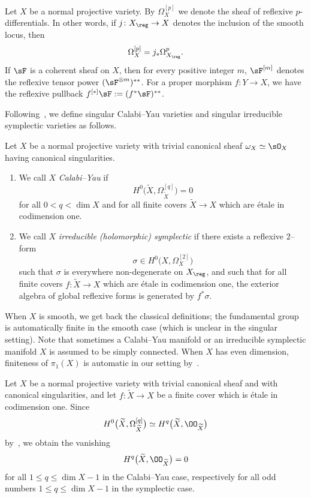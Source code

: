 \begin{nota}\label{nota:main2.1}
Let $X$ be a normal projective variety. By $\Omega^{[p]}_X$ we denote the sheaf of reflexive $p$-differentials. In other words, if $j\colon X_{\reg} \to X$ denotes the inclusion of the smooth locus, then
\[
\Omega^{[p]}_X = j_*\Omega^p_{X_{\reg}}.
\]
If $\sF$ is a coherent sheaf on $X$, then for every positive integer $m$, $\sF^{[m]}$ denotes the reflexive tensor power $(\sF^{\otimes m})^{**}$. For a proper morphism $f\colon Y\to X$, we have the reflexive pullback $f^{[*]}\sF:=(f^*\sF)^{**}$.
\end{nota}

Following~\cite{GKP16}, we define singular Calabi--Yau varieties and singular irreducible symplectic varieties as follows.

\begin{defi}\label{def:CYSympl}
Let $X$ be a normal projective variety with trivial canonical sheaf $\omega_X \simeq \sO_X$ having canonical singularities.
\begin{enumerate}\alphenumi
\item \label{list-2.2.1}We call $X$ \emph{Calabi--Yau} if
\[
H^0 \big(\widetilde X, \Omega_{\widetilde X}^{[q]} \big) = 0
\]
for all $0 < q < \dim X$ and for all finite covers $\widetilde X \to X$ which are étale in codimension one.
\item \label{list-2.2.2}We call $X$ \emph{irreducible (holomorphic) symplectic} if there exists a reflexive $2$--form
\[
\sigma \in H^0\big(X, \Omega_{X}^{[2]} \big)
\]
such that $\sigma$ is everywhere non-degenerate on $X_{\reg}$, and such that for all finite covers $f\colon \widetilde X \to X$ which are étale in codimension one, the exterior algebra of global reflexive forms is generated by $f^*\sigma$.
\end{enumerate}
\end{defi}

When $X$ is smooth, we get back the classical definitions; the fundamental group is automatically finite in the smooth case (which is unclear in the singular setting). Note that sometimes a Calabi--Yau manifold or an irreducible symplectic manifold $X$ is assumed to be simply connected. When $X$ has even dimension, finiteness of $\pi_1(X)$ is automatic in our setting by~\cite[Proposition~8.23]{GKP16}.

\begin{rema}\label{rem4}
Let $X$ be a normal projective variety with trivial canonical sheaf and with canonical singularities, and let $f\colon \widetilde X \to X$ be a finite cover which is étale in codimension one. Since
\[
H^0\big(\widetilde X,\Omega^{[q]}_{\widetilde X}\big) \simeq H^q\big(\widetilde X,\OO_{\widetilde X}\big)
\]
by~\cite[Proposition~6.9]{GKP16}, we obtain the vanishing
\[
H^q\big(\widetilde X,\OO_{\widetilde X}\big) = 0
\]
for all $1 \leq q \leq \dim X-1$ in the Calabi--Yau case, respectively for all odd numbers $1 \leq q \leq \dim X-1$ in the symplectic case.
\end{rema}


